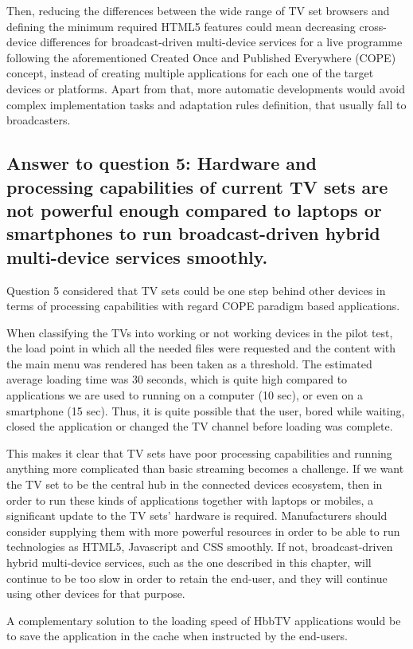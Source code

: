 Then, reducing the differences between the wide range of TV set browsers and defining the minimum required HTML5 features could mean decreasing cross-device differences for broadcast-driven multi-device services for a live programme following the aforementioned Created Once and Published Everywhere (COPE) concept, instead of creating multiple applications for each one of the target devices or platforms. Apart from that, more automatic developments would avoid complex implementation tasks and adaptation rules definition, that usually fall to broadcasters. 

\subsection{Answer to question 5: Hardware and processing capabilities of current TV sets are not powerful enough compared to laptops or smartphones to run broadcast-driven hybrid multi-device services smoothly.}
Question 5 considered that TV sets could be one step behind other devices in terms of processing capabilities with regard COPE paradigm based applications. 

When classifying the TVs into working or not working devices in the pilot test, the load point in which all the needed files were requested and the content with the main menu was rendered has been taken as a threshold. The estimated average loading time was 30 seconds, which is quite high compared to applications we are used to running on a computer (10 sec), or even on a smartphone (15 sec). Thus, it is quite possible that the user, bored while waiting, closed the application or changed the TV channel before loading was complete.

This makes it clear that TV sets have poor processing capabilities and running anything more complicated than basic streaming becomes a challenge. If we want the TV set to be the central hub in the connected devices ecosystem, then in order to run these kinds of applications together with laptops or mobiles, a significant update to the TV sets’ hardware is required. Manufacturers should consider supplying them with more powerful resources in order to be able to run technologies as HTML5, Javascript and CSS smoothly. If not, broadcast-driven hybrid multi-device services, such as the one described in this chapter, will continue to be too slow in order to retain the end-user, and they will continue using other devices for that purpose. 

A complementary solution to the loading speed of HbbTV applications would be to save the application in the cache when instructed by the end-users.

